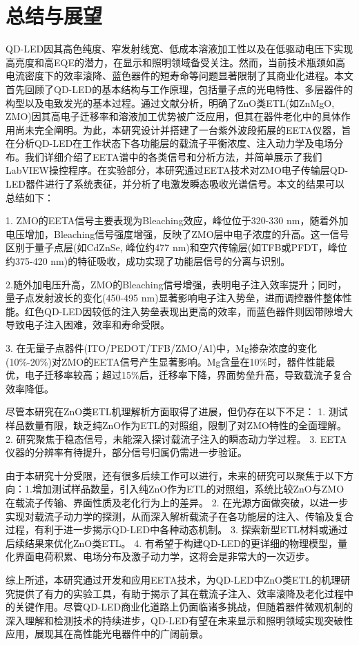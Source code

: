 
\chapter{总结与展望}
QD-LED因其高色纯度、窄发射线宽、低成本溶液加工性以及在低驱动电压下实现高亮度和高EQE的潜力，在显示和照明领域备受关注。然而，当前技术瓶颈如高电流密度下的效率滚降、蓝色器件的短寿命等问题显著限制了其商业化进程。本文首先回顾了QD-LED的基本结构与工作原理，包括量子点的光电特性、多层器件的构型以及电致发光的基本过程。通过文献分析，明确了ZnO类ETL(如ZnMgO, ZMO)因其高电子迁移率和溶液加工优势被广泛应用，但其在器件老化中的具体作用尚未完全阐明。为此，本研究设计并搭建了一台紫外波段拓展的EETA仪器，旨在分析QD-LED在工作状态下各功能层的载流子平衡浓度、注入动力学及电场分布。我们详细介绍了EETA谱中的各类信号和分析方法，并简单展示了我们LabVIEW操控程序。在实验部分，本研究通过EETA技术对ZMO电子传输层QD-LED器件进行了系统表征，并分析了电激发瞬态吸收光谱信号。本文的结果可以总结如下：

1. ZMO的EETA信号主要表现为Bleaching效应，峰位位于320-330 nm，随着外加电压增加，Bleaching信号强度增强，反映了ZMO层中电子浓度的升高。这一信号区别于量子点层(如CdZnSe, 峰位约477 nm)和空穴传输层(如TFB或PFDT，峰位约375-420 nm)的特征吸收，成功实现了功能层信号的分离与识别。

2.随外加电压升高，ZMO的Bleaching信号增强，表明电子注入效率提升；同时，量子点发射波长的变化(450-495 nm)显著影响电子注入势垒，进而调控器件整体性能。红色QD-LED因较低的注入势垒表现出更高的效率，而蓝色器件则因带隙增大导致电子注入困难，效率和寿命受限。

3. 在无量子点器件(ITO/PEDOT/TFB/ZMO/Al)中，Mg掺杂浓度的变化(10\%-20\%)对ZMO的EETA信号产生显著影响。Mg含量在10\%时，器件性能最优，电子迁移率较高；超过15\%后，迁移率下降，界面势垒升高，导致载流子复合效率降低。

尽管本研究在ZnO类ETL机理解析方面取得了进展，但仍存在以下不足：
1. 测试样品数量有限，缺乏纯ZnO作为ETL的对照组，限制了对ZMO特性的全面理解。
2. 研究聚焦于稳态信号，未能深入探讨载流子注入的瞬态动力学过程。
3. EETA仪器的分辨率有待提升，部分信号归属仍需进一步验证。

由于本研究十分受限，还有很多后续工作可以进行，未来的研究可以聚焦于以下方向：1.增加测试样品数量，引入纯ZnO作为ETL的对照组，系统比较ZnO与ZMO在载流子传输、界面性质及老化行为上的差异。
2. 在光源方面做突破，以进一步实现对载流子动力学的探测，从而深入解析载流子在各功能层的注入、传输及复合过程，有利于进一步揭示QD-LED中各种动态机制。
3. 探索新型ETL材料或通过后续结果来优化ZnO类ETL。
4. 有希望于构建QD-LED的更详细的物理模型，量化界面电荷积累、电场分布及激子动力学，这将会是非常大的一次迈步。

综上所述，本研究通过开发和应用EETA技术，为QD-LED中ZnO类ETL的机理研究提供了有力的实验工具，有助于揭示了其在载流子注入、效率滚降及老化过程中的关键作用。尽管QD-LED商业化道路上仍面临诸多挑战，但随着器件微观机制的深入理解和检测技术的持续进步，QD-LED有望在未来显示和照明领域实现突破性应用，展现其在高性能光电器件中的广阔前景。